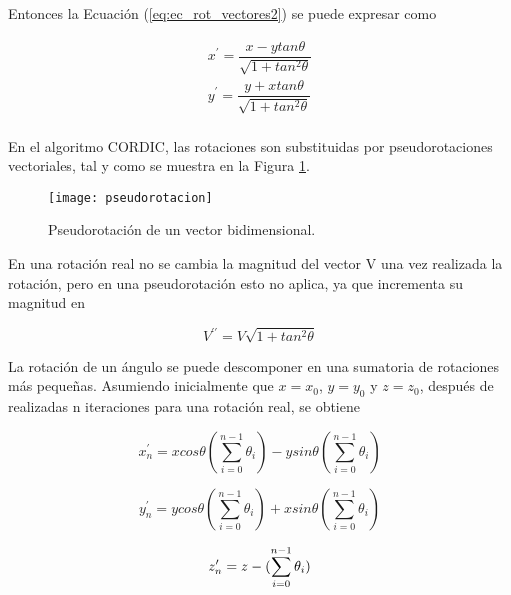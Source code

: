 Entonces la Ecuación (\ref{eq:ec_rot_vectores2}) se puede expresar como

\begin{equation}\label{eq:ec_rot_vectores3}
\begin{array}{l}
     x^{\prime} = \dfrac{x-ytan\theta}{\sqrt{1 + tan^{2}\theta}}\\
     y^{\prime} = \dfrac{y+xtan\theta}{\sqrt{1 + tan^{2}\theta}}\\
\end{array}
\end{equation}

En el algoritmo CORDIC, las rotaciones son substituidas por pseudorotaciones vectoriales, tal y como se muestra en la Figura \ref{fig:pseudorotacion}.

\begin{figure}[htb]
  \centering
  \texttt{[image: pseudorotacion]}
  \caption{Pseudorotación de un vector bidimensional.}
  \label{fig:pseudorotacion}
\end{figure}

En una rotación real no se cambia la magnitud del vector V una vez realizada la rotación, pero en una pseudorotación esto no aplica, ya que incrementa su magnitud en

\begin{equation} \label{eq:mag_pseudo}
V^{\prime \prime} = V\sqrt{1 + tan^{2}\theta}
\end{equation}

La rotación de un ángulo se puede descomponer en una sumatoria de rotaciones más pequeñas. Asumiendo inicialmente que $x=x_{0}$,  $y=y_{0}$ y $z=z_{0}$, después de realizadas n iteraciones para una rotación real, se obtiene


\begin{equation}\label{eq:ec_rot_real_x}
     x^{\prime}_{n} = xcos\theta(\sum_{i=0}^{n-1}\theta_{i}) - ysin\theta(\sum_{i=0}^{n-1}\theta_{i})
\end{equation}

\begin{equation}\label{eq:ec_rot_real_y}
     y^{\prime}_{n} = ycos\theta(\sum_{i=0}^{n-1}\theta_{i}) + xsin\theta(\sum_{i=0}^{n-1}\theta_{i})
\end{equation}

\begin{equation}\label{eq:ec_rot_real_z}
	z^{\prime}_{n} = z - (\sum_{i=0}^{n-1}\theta_{i})\\
\end{equation}

